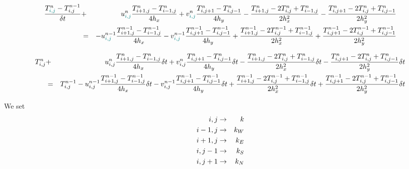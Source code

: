 \begin{eqnarray}
\frac{T_{{\color{teal} i,j}}^n-T_{i,j}^{n-1}}{\delta t} 
&+& 
  u^n_{{\color{teal} i,j}} \frac{T^n_{i+1,j}-T^n_{i-1,j}}{4h_x}
+ v^n_{{\color{teal} i,j}} \frac{T^n_{i,j+1}-T^n_{i,j-1}}{4h_y}
- \frac{T^n_{i+1,j}-2T^n_{i,j}+T^n_{i-1,j}}{2h_x^2}
- \frac{T^n_{i,j+1}-2T^n_{i,j}+T^n_{i,j-1}}{2h_y^2} \nonumber\\
&=&
- u^{n-1}_{{\color{teal} i,j}} \frac{T^{n-1}_{i+1,j}-T^{n-1}_{i-1,j}}{4h_x}
- v^{n-1}_{{\color{teal} i,j}} \frac{T^{n-1}_{i,j+1}-T^{n-1}_{i,j-1}}{4h_y}
+ \frac{T^{n-1}_{i+1,j}-2T^{n-1}_{i,j}+T^{n-1}_{i-1,j}}{2h_x^2}
+ \frac{T^{n-1}_{i,j+1}-2T^{n-1}_{i,j}+T^{n-1}_{i,j-1}}{2h_y^2} \nonumber
\end{eqnarray}

{\small
\begin{eqnarray}
T_{i,j}^n
&+& 
  u^n_{i,j} \frac{T^n_{i+1,j}-T^n_{i-1,j}}{4h_x} \delta t
+ v^n_{i,j} \frac{T^n_{i,j+1}-T^n_{i,j-1}}{4h_y}\delta t
- \frac{T^n_{i+1,j}-2T^n_{i,j}+T^n_{i-1,j}}{2h_x^2}\delta t
- \frac{T^n_{i,j+1}-2T^n_{i,j}+T^n_{i,j-1}}{2h_y^2}\delta t \nonumber\\
&=&
T_{i,j}^{n-1}
- u^{n-1}_{i,j} \frac{T^{n-1}_{i+1,j}-T^{n-1}_{i-1,j}}{4h_x}\delta t
- v^{n-1}_{i,j} \frac{T^{n-1}_{i,j+1}-T^{n-1}_{i,j-1}}{4h_y}\delta t
+ \frac{T^{n-1}_{i+1,j}-2T^{n-1}_{i,j}+T^{n-1}_{i-1,j}}{2h_x^2}\delta t
+ \frac{T^{n-1}_{i,j+1}-2T^{n-1}_{i,j}+T^{n-1}_{i,j-1}}{2h_y^2}\delta t \nonumber
\end{eqnarray}
}

We set 
\begin{eqnarray}
i,j &\rightarrow& k \nonumber\\
i-1,j &\rightarrow& k_W \nonumber\\
i+1,j &\rightarrow& k_E \nonumber\\
i,j-1 &\rightarrow& k_S \nonumber\\
i,j+1 &\rightarrow& k_N \nonumber
\end{eqnarray}

